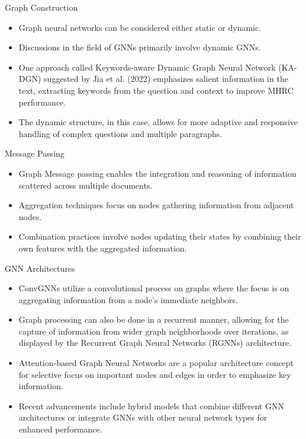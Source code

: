 \documentclass[10pt]{beamer}
\begin{document}
\begin{frame}[fragile]{Graph Construction}
  \begin{itemize}
    \item Graph neural networks can be considered either static or dynamic.
    \item Discussions in the field of GNNs primarily involve dynamic GNNs.
    \item One approach called Keywords-aware Dynamic Graph Neural Network (KA-DGN) suggested by Jia et al. (2022) \cite{RN171b} emphasizes salient information in the text, extracting keywords from the question and context to improve MHRC performance.
    \item The dynamic structure, in this case, allows for more adaptive and responsive handling of complex questions and multiple paragraphs.
  \end{itemize}
\end{frame}

\begin{frame}[fragile]{Message Passing}
  \begin{itemize}
    \item Graph Message passing enables the integration and reasoning of information scattered across multiple documents.
    \item Aggregation techniques focus on nodes gathering information from adjacent nodes.
    \item Combination practices involve nodes updating their states by combining their own features with the aggregated information.
  \end{itemize}
\end{frame}

\begin{frame}[fragile]{GNN Architectures}
  \begin{itemize}
    \item ConvGNNs utilize a convolutional process on graphs where the focus is on aggregating information from a node's immediate neighbors.
    \item Graph processing can also be done in a recurrent manner, allowing for the capture of information from wider graph neighborhoods over iterations, as displayed by the Recurrent Graph Neural Networks (RGNNs) architecture.
    \item Attention-based Graph Neural Networks are a popular architecture concept for selective focus on important nodes and edges in order to emphasize key information.
    \item Recent advancements include hybrid models that combine different GNN architectures or integrate GNNs with other neural network types for enhanced performance.
  \end{itemize}
\end{frame}
\end{document}
